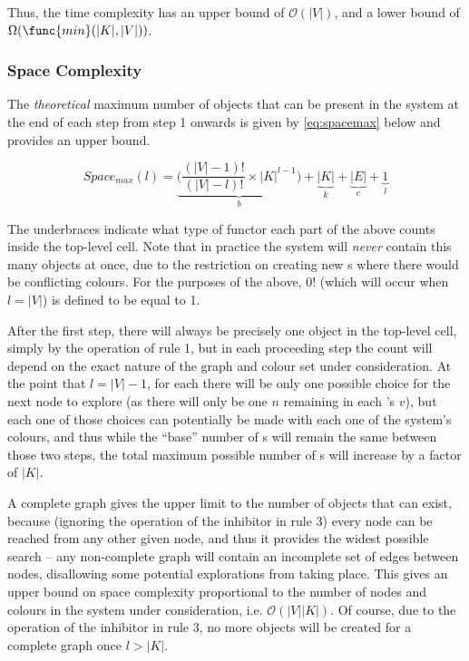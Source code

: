 Thus, the time complexity has an upper bound of \(\mathcal{O}(|V|)\), and a lower bound of \(\Omega(\func{min}(|K|, |V|))\).

\subsubsection{Space Complexity}
The \emph{theoretical} maximum number of objects that can be present in the system at the end of each step from step 1 onwards is given by \eqref{eq:spacemax} below and provides an upper bound.

\begin{equation}\label{eq:spacemax}
    Space_{max}(l) = \underbrace{\bigg(\frac{(|V| - 1)!}{(|V| - l)!} \times |K|^{l-1}\bigg)}_{b} + \underbrace{|K|}_{k} + \underbrace{|E|}_{e} + \underbrace{1}_{l}
\end{equation}

The underbraces indicate what type of functor each part of the above counts inside the top-level cell.  Note that in practice the system will \emph{never} contain this many objects at once, due to the restriction on creating new \bo{}s where there would be conflicting colours.  For the purposes of the above, \(0!\) (which will occur when \(l = |V|\)) is defined to be equal to 1.

After the first step, there will always be precisely one \bo{} object in the top-level cell, simply by the operation of rule 1, but in each proceeding step the count will depend on the exact nature of the graph and colour set under consideration.  At the point that \(l = |V| - 1\), for each \bo{} there will be only one possible choice for the next node to explore (as there will only be one \(n\) remaining in each \bo{}'s \(v\)), but each one of those choices can potentially be made with each one of the system's colours, and thus while the ``base'' number of \bo{}s will remain the same between those two steps, the total maximum possible number of \bo{}s will increase by a factor of \(|K|\).

A complete graph gives the upper limit to the number of objects that can exist, because (ignoring the operation of the inhibitor in rule 3) every node can be reached from any other given node, and thus it provides the widest possible search -- any non-complete graph will contain an incomplete set of edges between nodes, disallowing some potential explorations from taking place.  This gives an upper bound on space complexity proportional to the number of nodes and colours in the system under consideration, i.e. \(\mathcal{O}(|V||K|)\).  Of course, due to the operation of the inhibitor in rule 3, no more \bo{} objects will be created for a complete graph once \(l > |K|\).

